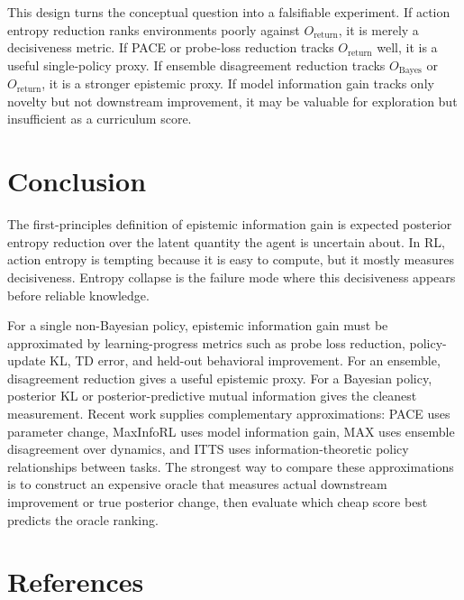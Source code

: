 \documentclass[11pt]{article}
\begin{document}
This design turns the conceptual question into a falsifiable experiment. If
action entropy reduction ranks environments poorly against
$O_{\mathrm{return}}$, it is merely a decisiveness metric. If PACE or probe-loss
reduction tracks $O_{\mathrm{return}}$ well, it is a useful single-policy proxy.
If ensemble disagreement reduction tracks $O_{\mathrm{Bayes}}$ or
$O_{\mathrm{return}}$, it is a stronger epistemic proxy. If model information
gain tracks only novelty but not downstream improvement, it may be valuable for
exploration but insufficient as a curriculum score.

\section{Conclusion}

The first-principles definition of epistemic information gain is expected
posterior entropy reduction over the latent quantity the agent is uncertain
about. In RL, action entropy is tempting because it is easy to compute, but it
mostly measures decisiveness. Entropy collapse is the failure mode where this
decisiveness appears before reliable knowledge.

For a single non-Bayesian policy, epistemic information gain must be approximated
by learning-progress metrics such as probe loss reduction, policy-update KL, TD
error, and held-out behavioral improvement. For an ensemble, disagreement
reduction gives a useful epistemic proxy. For a Bayesian policy, posterior KL or
posterior-predictive mutual information gives the cleanest measurement. Recent
work supplies complementary approximations: PACE uses parameter change, MaxInfoRL
uses model information gain, MAX uses ensemble disagreement over dynamics, and
ITTS uses information-theoretic policy relationships between tasks. The strongest
way to compare these approximations is to construct an expensive oracle that
measures actual downstream improvement or true posterior change, then evaluate
which cheap score best predicts the oracle ranking.

\section*{References}
\end{document}

